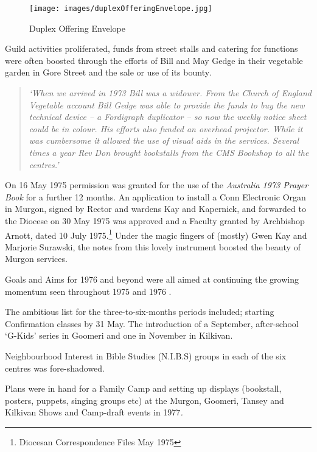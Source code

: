 \begin{figure}
\begin{center}
\texttt{[image: images/duplexOfferingEnvelope.jpg]}
\caption{Duplex Offering Envelope}
\end{center}
\end{figure}


Guild activities proliferated, funds from street stalls and catering for
functions were often boosted through the efforts of Bill and May Gedge
in their vegetable garden in Gore Street and the sale or use of its
bounty\emph{.}

\begin{quote}
\emph{`When we arrived in 1973 Bill was a widower. From the Church of
England Vegetable account Bill Gedge was able to provide the funds to
buy the new technical device -- a Fordigraph duplicator -- so now the
weekly notice sheet could be in colour. His efforts also funded an
overhead projector. While it was cumbersome it allowed the use of visual
aids in the services. Several times a year Rev Don brought bookstalls
from the CMS Bookshop to all the centres.'}
\end{quote}

On 16 May 1975 permission was granted for the use of the \emph{Australia
1973 Prayer Book} for a further 12 months. An application to install a
Conn Electronic Organ in Murgon, signed by Rector and wardens Kay and
Kapernick, and forwarded to the Diocese on 30 May 1975 was approved and
a Faculty granted by Archbishop Arnott, dated 10 July 1975.\footnote{Diocesan
  Correspondence Files May 1975} Under the magic fingers of (mostly)
Gwen Kay and Marjorie Surawski, the notes from this lovely instrument
boosted the beauty of Murgon services.

Goals and Aims for 1976 and beyond were all aimed at continuing the
growing momentum seen throughout 1975 and 1976 .

The ambitious list for the three-to-six-months periods included;
starting Confirmation classes by 31 May. The introduction of a
September, after-school `G-Kids' series in Goomeri and one in November
in Kilkivan.

Neighbourhood Interest in Bible Studies (N.I.B.S) groups in each of the
six centres was fore-shadowed.

Plans were in hand for a Family Camp and setting up displays (bookstall,
posters, puppets, singing groups etc) at the Murgon, Goomeri, Tansey and
Kilkivan Shows and Camp-draft events in 1977\emph{.}

